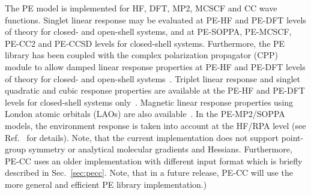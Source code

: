 The PE model is implemented for HF, DFT, MP2, MCSCF and
CC wave functions. Singlet linear response may be evaluated
at PE-HF and PE-DFT levels of theory for closed- and open-shell systems,
and at PE-SOPPA, PE-MCSCF, PE-CC2 and PE-CCSD levels for closed-shell systems.
Furthermore, the PE library has been coupled with the complex polarization
propagator (CPP) module to allow damped linear response properties at
PE-HF and PE-DFT levels of theory for closed- and open-shell systems~\cite{pecpp}.
Triplet linear response and singlet quadratic and cubic response properties are
available at the PE-HF and PE-DFT levels for closed-shell systems
only~\cite{pemodel}. Magnetic linear response properties using London atomic
orbitals (LAOs) are also available~\cite{pelao}. In the PE-MP2/SOPPA models, the
environment response is taken into account at the HF/RPA level
(see Ref.~\cite{pesoppa} for details). Note, that the current implementation
does not support point-group symmetry or analytical molecular gradients and Hessians.
Furthermore, PE-CC uses an older implementation with different input format which
is briefly described in Sec.~\ref{sec:pecc}. Note, that in a future release, PE-CC
will use the more general and efficient PE library implementation.)



